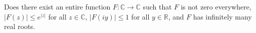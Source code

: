 Does there exist an entire function $F \colon \mathbb{C}\to \mathbb{C}$ such that $F$ is not zero everywhere, $|F(z)|\leq e^{|z|}$ for all $z\in \mathbb{C}$, $|F(iy)|\leq 1$ for all $y\in \mathbb{R}$, and $F$ has infinitely many real roots.